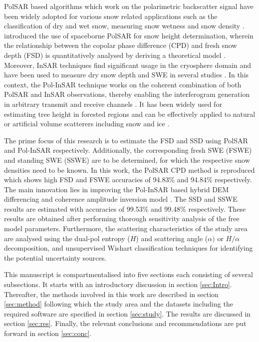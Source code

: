 \documentclass[review]{elsarticle}
\numberwithin{equation}{section}
\numberwithin{figure}{section}
\numberwithin{table}{section}
\begin{document}
PolSAR based algorithms which work on the polarimetric backscatter signal have been widely adopted for various snow related applications such as the classification of dry and wet snow, measuring snow wetness and snow density \citep{Singh2017, Snehmani2010, Thakur2012, Thakur2017, Usami2016}.  \cite{Leinss2014} introduced the use of spaceborne PolSAR for snow height determination, wherein the relationship between the copolar phase difference (CPD) and fresh snow depth (FSD) is quantitatively analysed by deriving a theoretical model \citep{Leinss2014}. Moreover, InSAR techniques find significant usage in the cryosphere domain and have been used to measure dry snow depth and SWE in several studies \citep{Conde2018, Guneriussen2001, Leinss2015, Li2017, Liu2017}. In this context, the Pol-InSAR technique works on the coherent combination of both PolSAR and InSAR observations, thereby enabling the interferogram generation in arbitrary transmit and receive channels \citep{Papathanassiou2001, Cloude2005, Cloude2010}. It has been widely used for estimating tree height in forested regions and can be effectively applied to natural or artificial volume scatterers including snow and ice \citep{Leinss2014, Hajnsek2009, Kugler2015, Kumar2017, Papathanassiou2001}.

The prime focus of this research is to estimate the FSD and SSD using PolSAR and Pol-InSAR respectively. Additionally, the corresponding fresh SWE (FSWE) and standing SWE (SSWE) are to be determined, for which the respective snow densities need to be known. In this work, the PolSAR CPD method \citep{Leinss2014} is reproduced which shows high FSD and FSWE accuracies of 94.83\% and 94.84\% respectively. The main innovation lies in improving the Pol-InSAR based hybrid DEM differencing and coherence amplitude inversion model \citep{Cloude2005, Cloude2010}. The SSD and SSWE results are estimated with accuracies of 99.53\% and 99.48\% respectively. These results are obtained after performing thorough sensitivity analysis of the free model parameters. Furthermore, the scattering characteristics of the study area are analysed using the dual-pol entropy ($H$) and scattering angle ($\alpha)$ or $H/{\alpha}$ decomposition, and unsupervised Wishart classification techniques \citep{Lee2009, Cloude2010, Singh2014} for identifying the potential uncertainty sources.

This manuscript is compartmentalised into five sections each consisting of several subsections. It starts with an introductory discussion in section \ref{sec:Intro}. Thereafter, the methods involved in this work are described in section \ref{sec:method} following which the study area and the datasets including the required  software are specified in section \ref{sec:study}. The results are discussed in section \ref{sec:res}. Finally, the relevant conclusions and recommendations are put forward in section \ref{sec:conc}.
\end{document}
